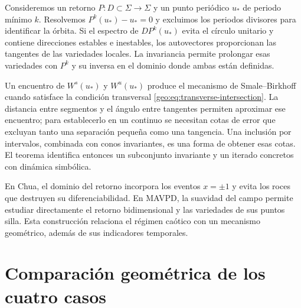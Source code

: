Consideremos un retorno \(P:D\subset\Sigma\to\Sigma\) y un punto
periódico \(u_*\) de periodo mínimo \(k\). Resolvemos
\(P^k(u_*)-u_*=0\) y excluimos los periodos divisores para identificar la
órbita. Si el espectro de \(DP^k(u_*)\) evita el círculo unitario y contiene
direcciones estables e inestables, los autovectores proporcionan las tangentes
de las variedades locales. La invariancia permite prolongar esas variedades
con \(P^k\) y su inversa en el dominio donde ambas están definidas.

Un encuentro de \(W^s(u_*)\) y \(W^u(u_*)\) produce el mecanismo de
Smale--Birkhoff cuando satisface la condición transversal
\eqref{geo:eq:transverse-intersection}. La distancia entre segmentos y el
ángulo entre tangentes permiten aproximar ese encuentro; para establecerlo
en un continuo se necesitan cotas de error que excluyan tanto una separación
pequeña como una tangencia. Una inclusión por intervalos, combinada con conos
invariantes, es una forma de obtener esas cotas. El teorema identifica entonces
un subconjunto invariante y un iterado concretos con dinámica simbólica.

En Chua, el dominio del retorno incorpora los eventos \(x=\pm1\) y evita
los roces que destruyen su diferenciabilidad. En MAVPD, la suavidad del campo
permite estudiar directamente el retorno bidimensional y las variedades de
sus puntos silla. Esta construcción relaciona el régimen caótico con un
mecanismo geométrico, además de sus indicadores temporales.

\section{Comparación geométrica de los cuatro casos}
\label{sec:geo-four-cases}

